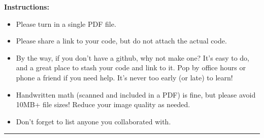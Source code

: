 \documentclass[11pt]{article}
\begin{document}
\renewcommand{\headrulewidth}{0.4pt}

{\bf Instructions:} 
\begin{itemize}[itemsep=-7pt]
	\item Please turn in a single PDF file.
	\item Please share a link to your code, but do not attach the actual code. 
	\item {\color{blue} By the way, if you don't have a github, why not make one? It's easy to do, and a great place to stash your code and link to it. Pop by office hours or phone a friend if you need help. It's never too early (or late) to learn!} 
	\item Handwritten math (scanned and included in a PDF) is fine, but please avoid 10MB+ file sizes! Reduce your image quality as needed. 
	\item Don't forget to list anyone you collaborated with. 
\end{itemize}
\vspace{0.1in}\hrule
\end{document}
